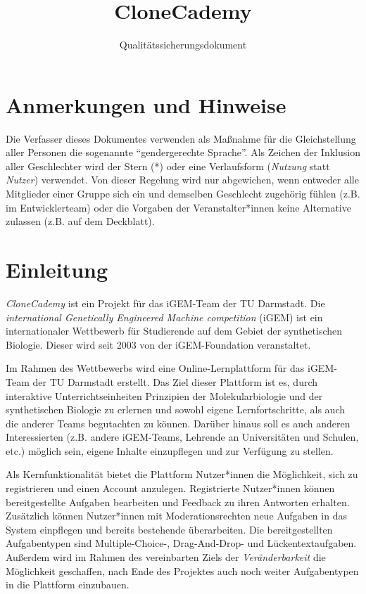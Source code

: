 \documentclass[accentcolor=tud0b,12pt,paper=a4]{tudreport}
\title{CloneCademy}
\subtitle{Qualitätssicherungsdokument}
\begin{document}
\maketitle
\tableofcontents

\chapter*{Anmerkungen und Hinweise}
Die Verfasser dieses Dokumentes verwenden als Maßnahme für die Gleichstellung aller Personen die sogenannte "`gendergerechte Sprache"'. Als Zeichen der Inklusion aller Geschlechter wird der Stern (*) oder eine Verlaufsform (\emph{Nutzung} statt \emph{Nutzer}) verwendet. Von dieser Regelung wird nur abgewichen, wenn entweder alle Mitglieder einer Gruppe sich ein und demselben Geschlecht zugehörig fühlen (z.B. im Entwicklerteam) oder die Vorgaben der Veranstalter*innen keine Alternative zulassen (z.B. auf dem Deckblatt).

\chapter{Einleitung}

\emph{CloneCademy} ist ein Projekt für das iGEM-Team der TU Darmstadt. Die \emph{international Genetically Engineered Machine competition} (iGEM) ist ein internationaler Wettbewerb für Studierende auf dem Gebiet der synthetischen Biologie.
Dieser wird seit 2003 von der iGEM-Foundation veranstaltet.

Im Rahmen des Wettbewerbs wird eine Online-Lernplattform für das iGEM-Team der TU Darmstadt erstellt. Das Ziel dieser Plattform ist es, durch interaktive Unterrichtseinheiten Prinzipien der Molekularbiologie und der synthetischen Biologie zu erlernen und sowohl eigene Lernfortschritte, als auch die anderer Teams begutachten zu können. Darüber hinaus soll es auch anderen Interessierten (z.B. andere iGEM-Teams, Lehrende an Universitäten und Schulen, etc.) möglich sein, eigene Inhalte einzupflegen und zur Verfügung zu stellen.

Als Kernfunktionalität bietet die Plattform Nutzer*innen die Möglichkeit, sich zu registrieren und einen Account anzulegen. Registrierte Nutzer*innen können bereitgestellte Aufgaben bearbeiten und Feedback zu ihren Antworten erhalten. Zusätzlich können Nutzer*innen mit Moderationsrechten neue Aufgaben in das System einpflegen und bereits bestehende überarbeiten. Die bereitgestellten Aufgabentypen sind Multiple-Choice-, Drag-And-Drop- und Lückentextaufgaben. Außerdem wird im Rahmen des vereinbarten Ziels der \emph{Veränderbarkeit} die Möglichkeit geschaffen, nach Ende des Projektes auch noch weiter Aufgabentypen in die Plattform einzubauen.
\end{document}
